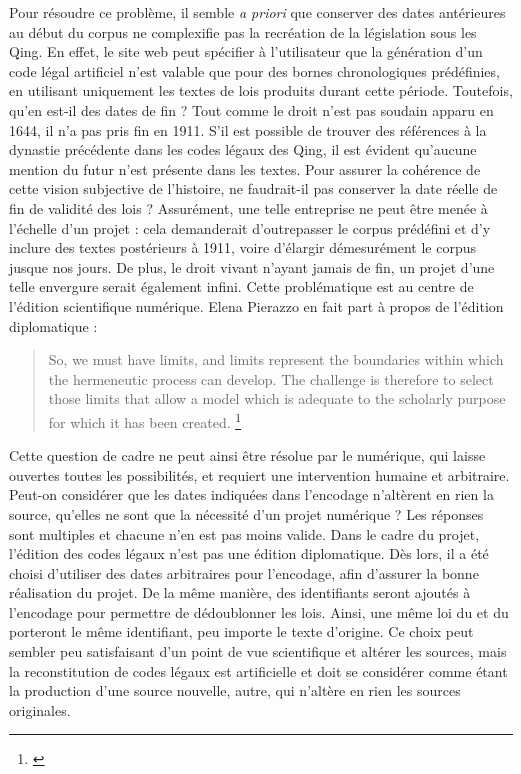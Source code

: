Pour résoudre ce problème, il semble \textit{a priori} que conserver des dates antérieures au début du corpus ne complexifie pas la recréation de la législation sous les Qing. En effet, le site web peut spécifier à l'utilisateur que la génération d'un code légal artificiel n'est valable que pour des bornes chronologiques prédéfinies, en utilisant uniquement les textes de lois produits durant cette période. Toutefois, qu'en est-il des dates de fin ? Tout comme le droit n'est pas soudain apparu en 1644, il n'a pas pris fin en 1911. S'il est possible de trouver des références à la dynastie précédente dans les codes légaux des Qing, il est évident qu'aucune mention du futur n'est présente dans les textes. Pour assurer la cohérence de cette vision subjective de l'histoire, ne faudrait-il pas conserver la date réelle de fin de validité des lois ? Assurément, une telle entreprise ne peut être menée à l'échelle d'un projet : cela demanderait d'outrepasser le corpus prédéfini et d'y inclure des textes postérieurs à 1911, voire d'élargir démesurément le corpus jusque nos jours. De plus, le droit vivant n'ayant jamais de fin, un projet d'une telle envergure serait également infini. Cette problématique est au centre de l'édition scientifique numérique. Elena Pierazzo en fait part à propos de l'édition diplomatique : 

\begin{quote}
    So, we must have limits, and limits represent the boundaries within which the hermeneutic
process can develop. The challenge is therefore to select those limits that allow a model
which is adequate to the scholarly purpose for which it has been created.
\footnote{\cite{pierazzo_rationale_2011}}
\end{quote}

Cette question de cadre ne peut ainsi être résolue par le numérique, qui laisse ouvertes toutes les possibilités, et requiert une intervention humaine et arbitraire. Peut-on considérer que les dates indiquées dans l'encodage n'altèrent en rien la source, qu'elles ne sont que la nécessité d'un projet numérique ? Les réponses sont multiples et chacune n'en est pas moins valide. Dans le cadre du projet, l'édition des codes légaux n'est pas une édition diplomatique. Dès lors, il a été choisi d'utiliser des dates arbitraires pour l'encodage, afin d'assurer la bonne réalisation du projet. De la même manière, des identifiants \XML seront ajoutés à l'encodage \TEI pour permettre de dédoublonner les lois. Ainsi, une même loi du \huidian et du \dc porteront le même identifiant, peu importe le texte d'origine. Ce choix peut sembler peu satisfaisant d'un point de vue scientifique et altérer les sources, mais la reconstitution de codes légaux est artificielle et doit se considérer comme étant la production d'une source nouvelle, autre, qui n'altère en rien les sources originales. 
